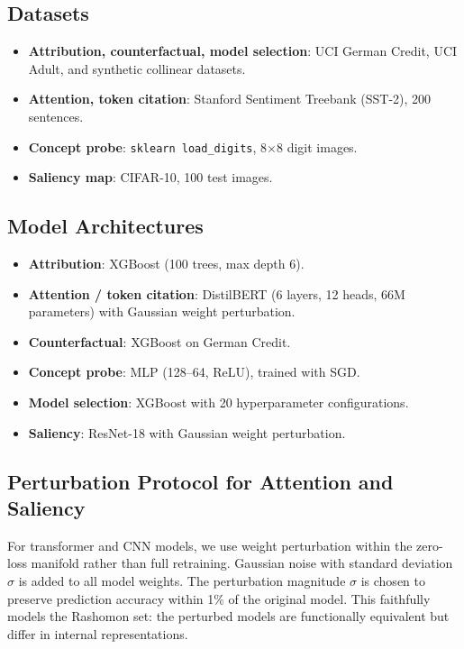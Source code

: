 \documentclass[11pt]{article}
\begin{document}
\subsection{Datasets}

\begin{itemize}
  \item \textbf{Attribution, counterfactual, model selection}: UCI German
    Credit, UCI Adult, and synthetic collinear datasets.
  \item \textbf{Attention, token citation}: Stanford Sentiment Treebank
    (SST-2), 200 sentences.
  \item \textbf{Concept probe}: \texttt{sklearn load\_digits}, 8$\times$8
    digit images.
  \item \textbf{Saliency map}: CIFAR-10, 100 test images.
\end{itemize}

\subsection{Model Architectures}

\begin{itemize}
  \item \textbf{Attribution}: XGBoost (100 trees, max depth 6).
  \item \textbf{Attention / token citation}: DistilBERT (6 layers, 12 heads,
    66M parameters) with Gaussian weight perturbation.
  \item \textbf{Counterfactual}: XGBoost on German Credit.
  \item \textbf{Concept probe}: MLP (128--64, ReLU), trained with SGD.
  \item \textbf{Model selection}: XGBoost with 20 hyperparameter
    configurations.
  \item \textbf{Saliency}: ResNet-18 with Gaussian weight perturbation.
\end{itemize}

\subsection{Perturbation Protocol for Attention and Saliency}

For transformer and CNN models, we use weight perturbation within the
zero-loss manifold rather than full retraining. Gaussian noise with
standard deviation $\sigma$ is added to all model weights. The
perturbation magnitude $\sigma$ is chosen to preserve prediction accuracy
within 1\% of the original model. This faithfully models the Rashomon
set: the perturbed models are functionally equivalent but differ in
internal representations.
\end{document}
